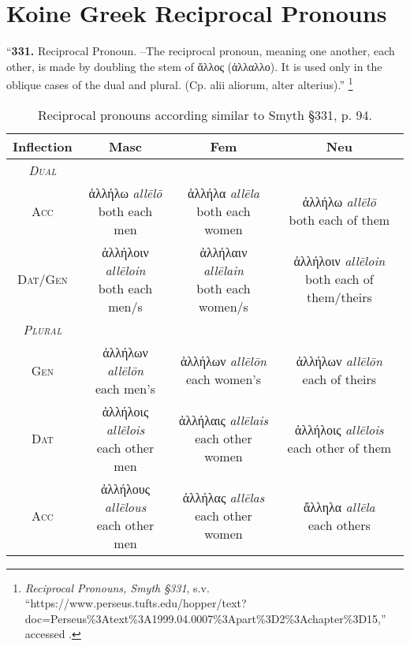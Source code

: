 \documentclass[10pt]{memoir}
\newcommand{\tsc}[1]{\textsc{#1}}
\newcommand{\grc}[1]{\fontspec{Inter}#1}
\newcommand{\trc}[1]{\textit{\fontspec{Tinos}#1}}
\newcommand{\linkfoot}[3]{\footnote{\emph{#1}, s.v. ``{#2},'' accessed \printdate{#3}.}}
\begin{document}
    \section*{Koine Greek Reciprocal Pronouns}

    ``\textbf{331.} Reciprocal Pronoun. --The reciprocal pronoun, meaning one another, each other, is made
    by doubling the stem of \grc{ἄλλος} (\grc{ἀλλαλλο}). \fontspec{} It is used only in the oblique cases of
    the dual and plural. (Cp. alii aliorum, alter alterius).''
    \linkfoot{Reciprocal Pronouns, Smyth §331}{https://www.perseus.tufts.edu/hopper/text?doc=Perseus\%3Atext\%3A1999.04.0007\%3Apart\%3D2\%3Achapter\%3D15}{2025-05-23}

    \begin{table}[H]
        \begin{tabular}{c|ccc}
            \textbf{Inflection} & \textbf{Masc} & \textbf{Fem} & \textbf{Neu} \\
            \hline
            \emph{\tsc{Dual}} \\
            \tsc{Acc} & \makecell{\grc{ἀλλήλω} \trc{allēlō} \\ \small both each men} & \makecell{\grc{ἀλλήλα} \trc{allēla} \\ \small both each women} & \makecell{\grc{ἀλλήλω} \trc{allēlō} \\ \small both each of them} \\
            \tsc{Dat/Gen} & \makecell{\grc{ἀλλήλοιν} \trc{allēloin} \\ \small both each men/s} & \makecell{\grc{ἀλλήλαιν} \trc{allēlain} \\ \small both each women/s} & \makecell{\grc{ἀλλήλοιν} \trc{allēloin} \\ \small both each of them/theirs} \\
            \hline
            \emph{\tsc{Plural}} \\
            \tsc{Gen} & \makecell{\grc{ἀλλήλων} \trc{allēlōn} \\ \small each men's} & \makecell{\grc{ἀλλήλων} \trc{allēlōn} \\ \small each women's} & \makecell{\grc{ἀλλήλων} \trc{allēlōn} \\ \small each of theirs} \\
            \tsc{Dat} & \makecell{\grc{ἀλλήλοις} \trc{allēlois} \\ \small each other men} & \makecell{\grc{ἀλλήλαις} \trc{allēlais}\\ \small each other women} & \makecell{\grc{ἀλλήλοις} \trc{allēlois} \\ \small each other of them } \\
            \tsc{Acc} & \makecell{\grc{ἀλλήλους} \trc{allēlous} \\ \small each other men} & \makecell{\grc{ἀλλήλας} \trc{allēlas} \\ \small each other women} & \makecell{\grc{ἄλληλα} \trc{allēla} \\ \small each others} \\
        \end{tabular}
        \caption{Reciprocal pronouns according similar to Smyth §331, p. 94.}
    \end{table}
\end{document}
